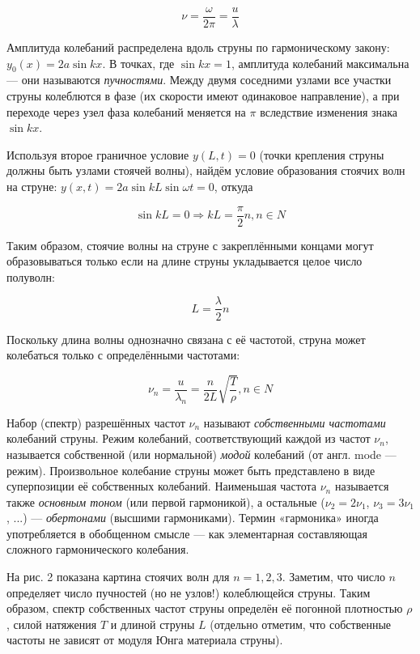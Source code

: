 \documentclass[14pt]{article}
\begin{document}
$$\nu = \frac{\omega}{2\pi} = \frac{u}{\lambda}$$

Амплитуда колебаний распределена вдоль струны по гармоническому закону: $y_0(x) = 2a\sin kx$. В точках, где $\sin kx = 1$, амплитуда колебаний максимальна — они называются \textsl{пучностями}. Между двумя соседними узлами все участки струны колеблются в фазе (их скорости имеют одинаковое направление), а при переходе через узел фаза колебаний меняется на $\pi$ вследствие изменения знака $\sin kx$.

Используя второе граничное условие $y(L, t) = 0$ (точки крепления струны должны быть узлами стоячей волны), найдём условие образования стоячих
волн на струне: $y(x, t) = 2a\sin kL \sin \omega t = 0$, откуда 

$$\sin kL = 0 \Rightarrow kL = \frac{\pi}{2}n, n \in N$$

Таким образом, стоячие волны на струне с закреплёнными концами могут образовываться только если на длине струны укладывается целое число полуволн:

\begin{center}
\begin{equation}
L = \frac{\lambda}{2}n
\end{equation}
\end{center}

Поскольку длина волны однозначно связана с её частотой, струна может колебаться только с определёнными частотами:

\begin{center}
\begin{equation}
\nu_n = \frac{u}{\lambda_n} = \frac{n}{2L}\sqrt{\frac{T}{\rho}}, n \in N
\end{equation}
\end{center}

Набор (спектр) разрешённых частот $\nu_n$ называют \textsl{собственными частотами} колебаний струны. Режим колебаний, соответствующий каждой из частот $\nu_n$, называется собственной (или нормальной) \textsl{модой} колебаний (от англ. mode --- режим). Произвольное колебание струны может быть представлено в виде суперпозиции её собственных колебаний. Наименьшая частота $\nu_n$ называется также \textsl{основным тоном} (или первой гармоникой), а остальные ($\nu_2 = 2\nu_1$, $\nu_3 = 3\nu_1$, ...) --- \textsl{обертонами} (высшими гармониками). Термин «гармоника» иногда употребляется в обобщенном смысле — как элементарная составляющая сложного гармонического колебания.

На рис. 2 показана картина стоячих волн для $n = 1, 2, 3$. Заметим, что число $n$ определяет число пучностей (но не узлов!) колеблющейся струны. Таким образом, спектр собственных частот струны определён её погонной плотностью $\rho$, силой натяжения $T$ и длиной струны $L$ (отдельно отметим, что собственные частоты не зависят от модуля Юнга материала струны).
\end{document}

